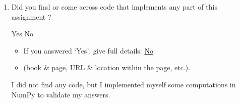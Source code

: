 \documentclass[11pt,addpoints,answers]{exam}
\numberwithin{equation}{section} %
\numberwithin{figure}{section} %
\numberwithin{table}{section} %
\begin{document}
\begin{enumerate}
    \item Did you find or come across code that implements any part of this assignment ? 
    \begin{checkboxes}
     \choice Yes
     \CorrectChoice No
    \end{checkboxes}
    \begin{itemize}
        \item If you answered `Yes', give full details: \underline{No}
        \item (book \& page, URL \& location within the page, etc.).
    \end{itemize}
    \begin{tcolorbox}[fit,height=3cm,blank, borderline={1pt}{-2pt},nobeforeafter]
        I did not find any code, but I implemented myself some computations in NumPy to validate my answers.
    \end{tcolorbox}
\end{enumerate}
\end{document}
